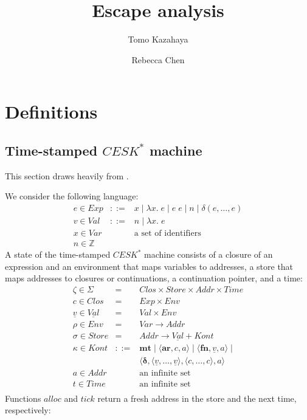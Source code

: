\RequirePackage[hyphens]{url}\documentclass[12pt,oneside]{amsart}
\title{Escape analysis}
\author{Tomo Kazahaya \and Rebecca Chen}
\newcommand{\kw}[1]{\mathbf{#1}}
\newcommand{\lmd}[2]{\lambda #1.\;#2}
\begin{document}
\maketitle

\section{Definitions}

\subsection{Time-stamped $CESK^\ast$ machine}

This section draws heavily from \cite{CS152, HM}.

We consider the following language:
\[\begin{array}{lll}
    e \in Exp & ::= &
        x \mid \lmd{x}{e} \mid e\;e \mid n \mid \delta\left(e,\ldots,e\right) \\
    v \in Val & ::= & n \mid \lmd{x}{e} \\
    x \in Var & & \text{a set of identifiers} \\
    n \in \mathbb{Z}
\end{array}\]
A state of the time-stamped $CESK^\ast$ machine consists of a closure of an expression and an environment that maps variables to addresses, a store that maps addresses to closures or continuations, a continuation pointer, and a time:
\[\begin{array}{lll}
    \zeta \in \Sigma & = & Clos \times Store \times Addr \times Time \\
    c \in Clos & = & Exp \times Env \\
    \underline{v} \in \underline{Val} & = & Val \times Env \\
    \rho \in Env & = & Var \rightarrow Addr \\
    \sigma \in Store & = & Addr \rightarrow \underline{Val} + Kont \\
    \kappa \in Kont & ::= & \kw{mt} \mid \langle\kw{ar}, c, a\rangle
        \mid \langle\kw{fn}, \underline{v}, a\rangle \mid \\ & & \langle\pmb{\delta}, \langle\underline{v}, \ldots, \underline{v}\rangle, \langle c, \ldots, c\rangle, a\rangle \\
    a \in Addr & & \text{an infinite set} \\
    t \in Time & & \text{an infinite set} \\
\end{array}\]
Functions $alloc$ and $tick$ return a fresh address in the store and the next time, respectively:
\end{document}
